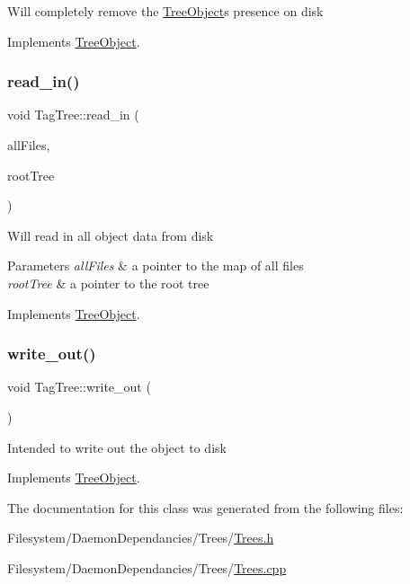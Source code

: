 Will completely remove the \mbox{\hyperlink{class_tree_object}{Tree\+Object}}\textquotesingle{}s presence on disk 

Implements \mbox{\hyperlink{class_tree_object_af390b7479aa972888e594c07a85740b6}{Tree\+Object}}.

\mbox{\label{class_tag_tree_af86ee6713fa03c3909e04608512b8b62}} 
\subsubsection{\texorpdfstring{read\+\_\+in()}{read\_in()}}
{\footnotesize\ttfamily void Tag\+Tree\+::read\+\_\+in (\begin{DoxyParamCaption}\item[{unordered\+\_\+multimap$<$ string, \mbox{\hyperlink{class_file_info}{File\+Info}} $\ast$$>$ $\ast$}]{all\+Files,  }\item[{\mbox{\hyperlink{class_root_tree}{Root\+Tree}} $\ast$}]{root\+Tree }\end{DoxyParamCaption})\hspace{0.3cm}{\ttfamily [virtual]}}

Will read in all object data from disk 
\begin{DoxyParams}{Parameters}
{\em all\+Files} & a pointer to the map of all files \\
\hline
{\em root\+Tree} & a pointer to the root tree \\
\hline
\end{DoxyParams}


Implements \mbox{\hyperlink{class_tree_object_a722eb00e6782626281afc8eff92840a4}{Tree\+Object}}.

\mbox{\label{class_tag_tree_adf13e01b25991ecfef1ad958e02c07fe}} 
\subsubsection{\texorpdfstring{write\+\_\+out()}{write\_out()}}
{\footnotesize\ttfamily void Tag\+Tree\+::write\+\_\+out (\begin{DoxyParamCaption}{ }\end{DoxyParamCaption})\hspace{0.3cm}{\ttfamily [virtual]}}

Intended to write out the object to disk 

Implements \mbox{\hyperlink{class_tree_object_a63708d61353d83e3e03597394bb7aca0}{Tree\+Object}}.



The documentation for this class was generated from the following files\+:\begin{DoxyCompactItemize}
\item 
Filesystem/\+Daemon\+Dependancies/\+Trees/\mbox{\hyperlink{_trees_8h}{Trees.\+h}}\item 
Filesystem/\+Daemon\+Dependancies/\+Trees/\mbox{\hyperlink{_trees_8cpp}{Trees.\+cpp}}\end{DoxyCompactItemize}
